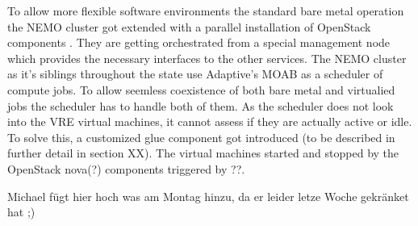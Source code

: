 To allow more flexible software environments the standard bare metal operation
the NEMO cluster got extended with a parallel installation of OpenStack
components \cite{hpc-symp:2016}. They are getting orchestrated from a special
management node which provides the necessary interfaces to the other services.
The NEMO cluster as it's siblings throughout the state use Adaptive's MOAB as a
scheduler of compute jobs. To allow seemless coexistence of both bare metal and
virtualied jobs the scheduler has to handle both of them. As the scheduler does
not look into the VRE virtual machines, it cannot assess if they are actually
active or idle. To solve this, a customized glue component got introduced (to be
described in further detail in section XX). The virtual machines started and
stopped by the OpenStack nova(?) components triggered by ??.

Michael fügt hier hoch was am Montag hinzu, da er leider letze Woche gekränket
hat ;)

